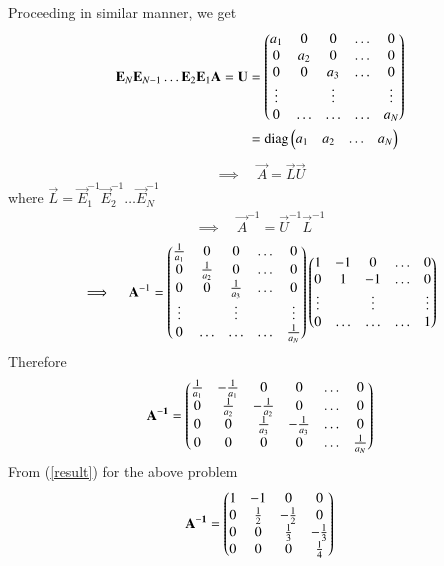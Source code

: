 \documentclass[journal,12pt,twocolumn]{IEEEtran}
\begin{document}
Proceeding in similar manner, we get
\begin{align}
	\mathbf{E}_N\mathbf{E}_{N-1}\ldots\mathbf{E}_2\mathbf{E}_1\mathbf{A} = \mathbf{U} 
	&= 
	\begin{pmatrix} a_1 & 0 & 0 & \ldots & 0 \\
		0 & a_2 & 0 & \ldots & 0 \\
		0 & 0   & a_3 & \ldots & 0 \\
		\vdots & & \vdots &  & \vdots  \\
		    0 & \ldots & \ldots & \ldots & a_N \end{pmatrix} \\
	&= \text{diag} \begin{pmatrix}a_1 & a_2 & \ldots & a_N\end{pmatrix}
\end{align}
\begin{align}
	\implies \quad \vec{A} = \vec{L} \vec{U} 
\end{align}
	where \quad 
	$\vec{L} = \vec{E}_1^{-1} \vec{E}_2^{-1} \ldots \vec{E}_N^{-1}$ 
\begin{align}
	\implies \quad \vec{A}^{-1}  = \vec{U}^{-1} \vec{L}^{-1} 
\end{align}
\begin{align}
	\implies \quad \mathbf{A}^{-1}  
	= 
	\begin{pmatrix} \frac{1}{a_1} & 0 & 0 & \ldots & 0 \\
		0 & \frac{1}{a_2} & 0 & \ldots & 0 \\
		0 & 0   & \frac{1}{a_3} & \ldots & 0 \\
		\vdots & & \vdots &  & \vdots  \\
		    0 & \ldots & \ldots & \ldots & \frac{1}{a_N} \end{pmatrix}
	 \begin{pmatrix}1 & -1 & 0 & \ldots & 0 \\
			    0 & 1 &-1 & \ldots & 0 \\
			  \vdots & & \vdots &  & \vdots  \\
			    0 & \ldots & \ldots & \ldots & 1 \end{pmatrix}
\end{align}
Therefore
\begin{align}
	\vec{A^{-1}} = \myvec{\frac{1}{a_1} &-\frac{1}{a_1} & 0 & 0&\ldots &0 \\
			0 & \frac{1}{a_2} & -\frac{1}{a_2} & 0 & \ldots &0 \\
			0 & 0 & \frac{1}{a_3} & -\frac{1}{a_3} & \ldots &0\\
			0 & 0 & 0 & 0 & \ldots & \frac{1}{a_N}} \label{result}
\end{align}
From (\ref{result}) for the above problem 
\begin{align}
        \mathbf{A^{-1}} = \begin{pmatrix} 1 & -1 & 0 & 0 \\
                        0 & \frac{1}{2} & -\frac{1}{2} & 0 \\
                        0 & 0 & \frac{1}{3} & -\frac{1}{3} \\
                        0 & 0 & 0 & \frac{1}{4}\end{pmatrix}
\end{align}
\end{document}
